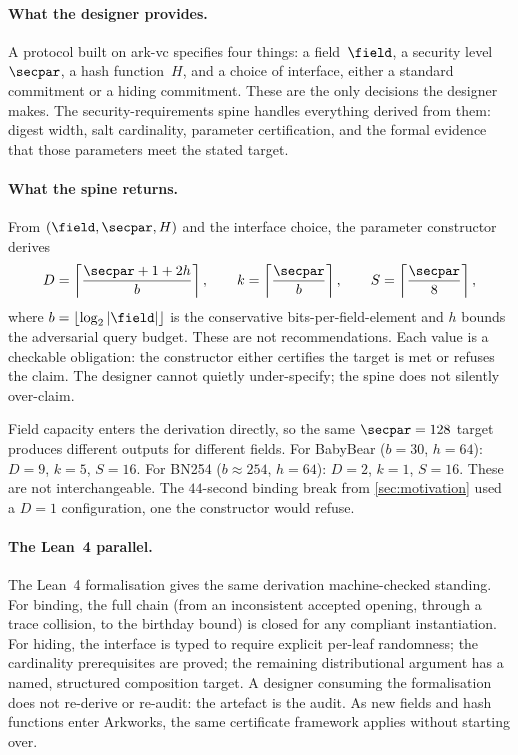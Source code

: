 \label{sec:attack}


\paragraph{What the designer provides.}
A protocol built on \textsf{ark-vc} specifies four things: a field~$\field$,
a security level~$\secpar$, a hash function~$H$, and a choice of
interface, either a standard commitment or a hiding commitment.  These are the
only decisions the designer makes.  The security-requirements spine handles
everything derived from them: digest width, salt cardinality, parameter
certification, and the formal evidence that those parameters meet the stated
target.

\paragraph{What the spine returns.}
From $(\field,\secpar,H)$ and the interface choice, the parameter constructor
derives
\[
  D=\left\lceil\frac{\secpar+1+2h}{b}\right\rceil,\qquad
  k=\left\lceil\frac{\secpar}{b}\right\rceil,\qquad
  S=\left\lceil\frac{\secpar}{8}\right\rceil,
\]
where $b=\lfloor\log_2|\field|\rfloor$ is the conservative bits-per-field-element
and $h$ bounds the adversarial query budget.  These are not recommendations.
Each value is a checkable obligation: the constructor either certifies the
target is met or refuses the claim.  The designer cannot quietly under-specify;
the spine does not silently over-claim.

Field capacity enters the derivation directly, so the same $\secpar=128$ target
produces different outputs for different fields.  For BabyBear ($b=30$, $h=64$):
$D=9$, $k=5$, $S=16$.  For BN254 ($b\approx254$, $h=64$): $D=2$, $k=1$,
$S=16$.  These are not interchangeable.  The $44$-second binding break from
\cref{sec:motivation} used a $D=1$ configuration, one the constructor would
refuse.

\paragraph{The Lean~4 parallel.}
The Lean~4 formalisation gives the same derivation machine-checked standing.
For binding, the full chain (from an inconsistent accepted opening, through a
trace collision, to the birthday bound) is closed for any compliant
instantiation.  For hiding, the interface is typed to require explicit per-leaf
randomness; the cardinality prerequisites are proved; the remaining
distributional argument has a named, structured composition target.  A designer
consuming the formalisation does not re-derive or re-audit: the artefact is the
audit.  As new fields and hash functions enter \textsf{Arkworks}, the same
certificate framework applies without starting over.
